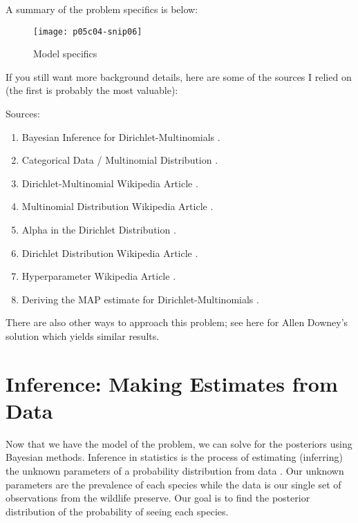 A summary of the problem specifics is below:

\begin{figure*}[h]
    \texttt{[image: p05c04-snip06]}
    \caption{Model specifics}
\end{figure*}


If you still want more background details, here are some of the sources I relied on (the first is probably the most valuable):

Sources:


\begin{enumerate}
\item Bayesian Inference for Dirichlet-Multinomials \cite{MarkJohnsonDirichletMultinomials2019}.
\item Categorical Data / Multinomial Distribution \cite{ChristianHertaCategoricaldata2019}.
\item Dirichlet-Multinomial Wikipedia Article \cite{WikiPediaDirichletmultinomial2019}.
\item Multinomial Distribution Wikipedia Article \cite{WikiPediaMultinomialdistribution2019}.
\item Alpha in the Dirichlet Distribution \cite{stackexchangealphaDirichlet2019}.
\item Dirichlet Distribution Wikipedia Article \cite{WikiPediaDirichletdistributionl2019}.
\item Hyperparameter Wikipedia Article \cite{WikiPediaHyperparameter2019}.
\item Deriving the MAP estimate for Dirichlet-Multinomials \cite{stackexchangeMAPMultinomialDirichlet2019}.
\end{enumerate}

There are also other ways to approach this problem; see here for Allen Downey's solution \cite{AllenBDowneyThinkBayes2018} which yields similar results.

\section{Inference: Making Estimates from Data}

Now that we have the model of the problem, we can solve for the posteriors using Bayesian methods. Inference in statistics is the process of estimating (inferring) the unknown parameters of a probability distribution from data \cite{WikiPediaStatisticalinference2019}. Our unknown parameters are the prevalence of each species while the data is our single set of observations from the wildlife preserve. Our goal is to find the posterior distribution of the probability of seeing each species.

